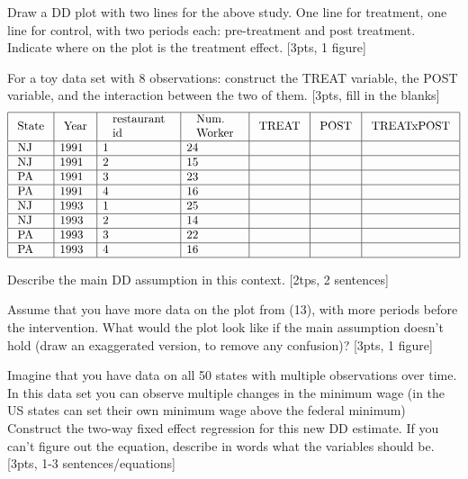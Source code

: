 \item Draw a DD plot with two lines for the above study. One line for treatment, one line for control, with two periods each: pre-treatment and post treatment. Indicate where on the plot is the treatment effect. [3pts, 1 figure]
\vspace{6cm}

\clearpage 
\item For a toy data set with 8 observations: construct the TREAT variable, the POST variable, and the interaction between the two of them. [3pts, fill in the blanks]
$$
\begin{array}{|l|l|l|l|l|l|l|}
\hline \text { State } & \text { Year } & \begin{array}{l}
\text { restaurant } \\
\text { id }
\end{array} & \begin{array}{l}
\text { Num. } \\
\text { Worker }
\end{array} & \text { TREAT } & \text { POST } & \text { TREATxPOST } \\
\hline \text { NJ } & 1991 & 1 & 24 & & & \\
\hline \text { NJ } & 1991 & 2 & 15 & & & \\
\hline \text { PA } & 1991 & 3 & 23 & & & \\
\hline \text { PA } & 1991 & 4 & 16 & & & \\
\hline \text { NJ } & 1993 & 1 & 25 & & & \\
\hline \text { NJ } & 1993 & 2 & 14 & & & \\
\hline \text { PA } & 1993 & 3 & 22 & & & \\
\hline \text { PA } & 1993 & 4 & 16 & & & \\
\hline
\end{array}
$$

\item Describe the main DD assumption in this context. [2tps, 2 sentences]
\vspace{2cm}
\item Assume that you have more data on the plot from (13), with more periods before the intervention. What would the plot look like if the main assumption doesn't hold (draw an exaggerated version, to remove any confusion)? [3pts, 1 figure]
\vspace{6cm}
\item Imagine that you have data on all 50 states with multiple observations over time. In this data set you can observe multiple changes in the minimum wage (in the US states can set their own minimum wage above the federal minimum) Construct the two-way fixed effect regression for this new DD estimate. If you can’t figure out the equation, describe in words what the variables should be. [3pts, 1-3 sentences/equations]
\vspace{4cm}


